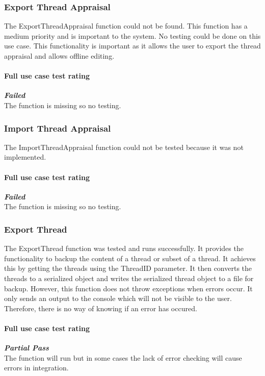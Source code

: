 \subsubsection{Export Thread Appraisal}
The ExportThreadAppraisal function could not be found. This function has a medium priority and is important to the system. No testing could be done on this use case. This functionality is important as it allows the user to  export the thread appraisal and allows offline editing.
\paragraph{\color{black} Full use case test rating\\}
\color{red}
\textbf{\small \emph{Failed}} \\
\color{black} The function is missing so no testing.

\subsubsection{Import Thread Appraisal}
The ImportThreadAppraisal function could not be tested because it was not implemented. 
\paragraph{\color{black} Full use case test rating\\}
\color{red}
\textbf{\small \emph{Failed}} \\
\color{black} The function is missing so no testing.

\subsubsection{Export Thread}
The ExportThread function was tested and runs successfully. It provides the functionality to backup the content of a thread or subset of a thread. It achieves this by getting the threads using the ThreadID parameter. It then converts the threads to a serialized object and writes the serialized thread object to a file for backup. However, this function does not throw exceptions when errors occur. It only sends an output to the console which will not be visible to the user. Therefore, there is no way of knowing if an error has occured.
\paragraph{\color{black} Full use case test rating\\}
\color{myOrange}
\textbf{\small \emph{Partial Pass}} \\
\color{black} The function will run but in some cases the lack of error checking will cause errors in integration.
